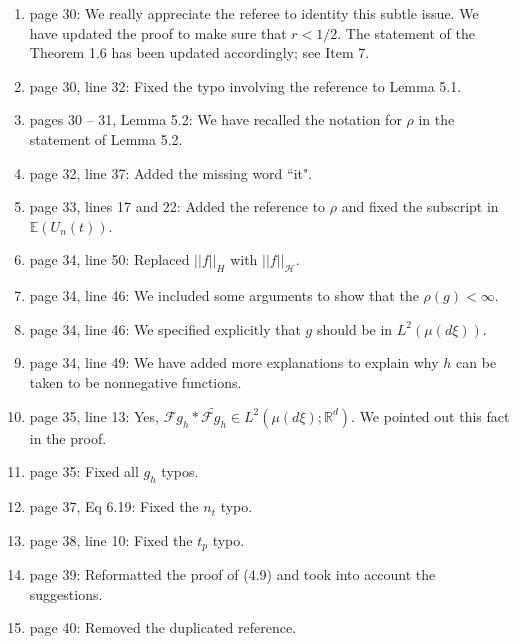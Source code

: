 \documentclass[12pt]{article}%
\theoremstyle{plain}
\theoremstyle{definition}
\def\R{\mathbb{R}}
\newcommand{\Norm}[1]{\left|\left|  #1   \right|\right|}
\numberwithin{equation}{section}
\begin{document}
\begin{enumerate}
  \item[63.] page 30: We really appreciate the referee to identity this subtle issue. We have
    updated the proof to make sure that $r<1/2$. The statement of the Theorem 1.6 has been updated
    accordingly; see Item 7.
  \item[64.] page 30, line 32: Fixed the typo involving the reference to Lemma 5.1.

  \item[65.] pages 30 -- 31, Lemma 5.2: We have recalled the notation for
    $\rho$ in the statement of Lemma 5.2.

  \item[66.] page 32, line 37: Added the missing word ``it".
  \item[67.] page 33, lines 17 and 22: Added the reference to $\rho$ and fixed the subscript in
    $\mathbb{E}(U_n(t))$.
  \item[68.] page 34, line 50: Replaced $\Norm{f}_H$ with $\Norm{f}_\mathcal{H}$.
  \item[69.] page 34, line 46: We included some arguments to show that the $\rho(g)<\infty$.
  \item[70.] page 34, line 46: We specified explicitly that $g$ should be in $L^2(\mu(d\xi))$.
  \item[71.] page 34, line 49: We have added more explanations to explain why $h$ can be taken to
    be nonnegative functions.
  \item[72.] page 35, line 13: Yes, $\mathcal{F}g_h * \widetilde{\mathcal{F}g_h}\in
    L^2\left(\mu(d\xi);\R^d\right)$. We pointed out this fact in the proof.

  \item[73.] page 35: Fixed all $g_h$ typos.
  \item[74.] page 37, Eq 6.19: Fixed the $n_t$ typo.
  \item[75.] page 38, line 10: Fixed the $t_p$ typo.

  \item[76.] page 39: Reformatted the proof of (4.9) and took into account the
    suggestions.
  \item[77.] page 40: Removed the duplicated reference.
\end{enumerate}

%
%
\end{document}

